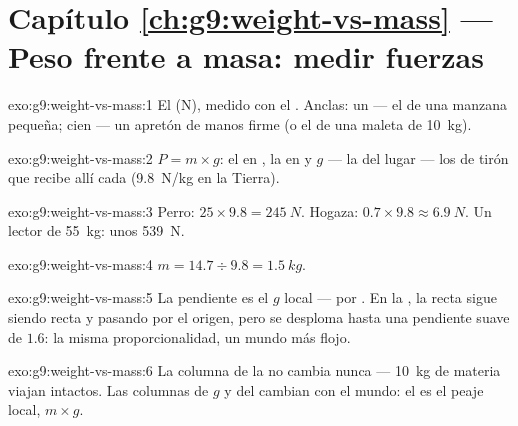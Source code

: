 \section*{Capítulo \ref{ch:g9:weight-vs-mass} --- Peso frente a masa: medir fuerzas}

\begin{solution}{exo:g9:weight-vs-mass:1}
El  (\unit{N}), medido con el . Anclas:
un  --- el  de una manzana pequeña; cien ---
un apretón de manos firme (o el  de una maleta de
\qty{10}{kg}).
\end{solution}

\begin{solution}{exo:g9:weight-vs-mass:2}
$P = m \times g$: el  en , la
 en  y $g$ --- la
 del lugar --- los  de tirón
que recibe allí cada  (\qty{9.8}{N/kg} en la Tierra).
\end{solution}

\begin{solution}{exo:g9:weight-vs-mass:3}
Perro: $25 \times 9.8 = \qty{245}{N}$. Hogaza: $0.7 \times 9.8 \approx
\qty{6.9}{N}$. Un lector de \qty{55}{kg}: unos \qty{539}{N}.
\end{solution}

\begin{solution}{exo:g9:weight-vs-mass:4}
$m = 14.7 \div 9.8 = \qty{1.5}{kg}$.
\end{solution}

\begin{solution}{exo:g9:weight-vs-mass:5}
La pendiente es el $g$ local ---  por
. En la , la recta sigue siendo recta y
pasando por el origen, pero se desploma hasta una pendiente suave de
$1.6$: la misma proporcionalidad, un mundo más flojo.
\end{solution}

\begin{solution}{exo:g9:weight-vs-mass:6}
La columna de la  no cambia nunca --- \qty{10}{kg} de materia
viajan intactos. Las columnas de $g$ y del  cambian con el
mundo: el  es el peaje local, $m \times g$.
\end{solution}

